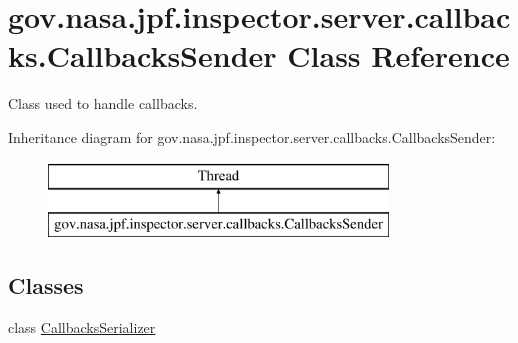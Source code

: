 \hypertarget{classgov_1_1nasa_1_1jpf_1_1inspector_1_1server_1_1callbacks_1_1_callbacks_sender}{}\section{gov.\+nasa.\+jpf.\+inspector.\+server.\+callbacks.\+Callbacks\+Sender Class Reference}
\label{classgov_1_1nasa_1_1jpf_1_1inspector_1_1server_1_1callbacks_1_1_callbacks_sender}


Class used to handle callbacks.  


Inheritance diagram for gov.\+nasa.\+jpf.\+inspector.\+server.\+callbacks.\+Callbacks\+Sender\+:\begin{figure}[H]
\begin{center}
\leavevmode
\includegraphics[height=2.000000cm]{classgov_1_1nasa_1_1jpf_1_1inspector_1_1server_1_1callbacks_1_1_callbacks_sender}
\end{center}
\end{figure}
\subsection*{Classes}
\begin{DoxyCompactItemize}
\item 
class \hyperlink{classgov_1_1nasa_1_1jpf_1_1inspector_1_1server_1_1callbacks_1_1_callbacks_sender_1_1_callbacks_serializer}{Callbacks\+Serializer}
\end{DoxyCompactItemize}
